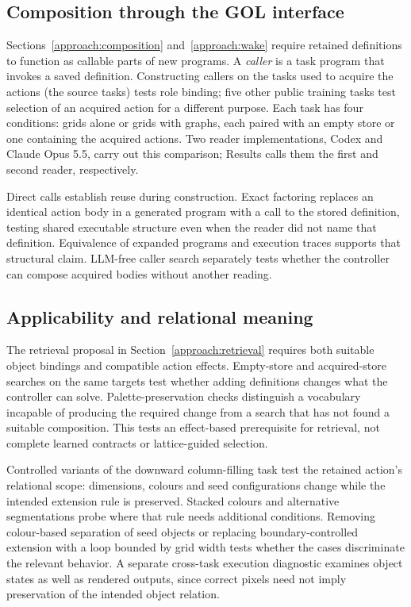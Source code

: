 \documentclass[11pt]{article}
\begin{document}
\subsection{Composition through the GOL interface}\label{design:composition}\label{design:interface-pilot}\label{design:target-readers}
Sections~\ref{approach:composition} and~\ref{approach:wake} require retained definitions to function as callable parts of new programs. A \emph{caller} is a task program that invokes a saved definition. Constructing callers on the tasks used to acquire the actions (the source tasks) tests role binding; five other public training tasks test selection of an acquired action for a different purpose. Each task has four conditions: grids alone or grids with graphs, each paired with an empty store or one containing the acquired actions. Two reader implementations, Codex and Claude Opus 5.5, carry out this comparison; Results calls them the first and second reader, respectively.

Direct calls establish reuse during construction. Exact factoring replaces an identical action body in a generated program with a call to the stored definition, testing shared executable structure even when the reader did not name that definition. Equivalence of expanded programs and execution traces supports that structural claim. LLM-free caller search separately tests whether the controller can compose acquired bodies without another reading.

\subsection{Applicability and relational meaning}\label{design:family}\label{design:cross-task-diagnostic}
The retrieval proposal in Section~\ref{approach:retrieval} requires both suitable object bindings and compatible action effects. Empty-store and acquired-store searches on the same targets test whether adding definitions changes what the controller can solve. Palette-preservation checks distinguish a vocabulary incapable of producing the required change from a search that has not found a suitable composition. This tests an effect-based prerequisite for retrieval, not complete learned contracts or lattice-guided selection.

Controlled variants of the downward column-filling task test the retained action's relational scope: dimensions, colours and seed configurations change while the intended extension rule is preserved. Stacked colours and alternative segmentations probe where that rule needs additional conditions. Removing colour-based separation of seed objects or replacing boundary-controlled extension with a loop bounded by grid width tests whether the cases discriminate the relevant behavior. A separate cross-task execution diagnostic examines object states as well as rendered outputs, since correct pixels need not imply preservation of the intended object relation.
\end{document}
